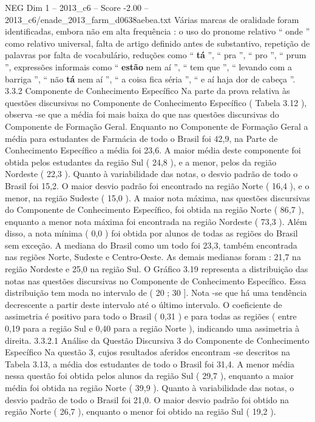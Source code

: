 \begin{textsample}{NEG Dim 1 – 2013\_c6 – Score -2.00 – 2013\_c6/enade\_2013\_farm\_d0638aebea.txt}
Várias marcas de oralidade foram identificadas, embora não em alta frequência : o uso do pronome relativo “ onde ” como relativo universal, falta de artigo definido antes de substantivo, repetição de palavras por falta de vocabulário, reduções como “ \textbf{tá} ”, “ pra ”, “ pro ”, “ prum ”, expressões informais como “ \textbf{estão} nem aí ”, “ tem que ”, “ levando com a barriga ”, “ não \textbf{tá} nem aí ”, “ a coisa fica séria ”, “ e aí haja dor de cabeça ”. 3.3.2 Componente de Conhecimento Específico Na parte da prova relativa às questões discursivas no Componente de Conhecimento Específico ( Tabela 3.12 ), observa -se que a média foi mais baixa do que nas questões discursivas do Componente de Formação Geral.
Enquanto no Componente de Formação Geral a média para estudantes de Farmácia de todo o Brasil foi 42,9, na Parte de Conhecimento Específico a média foi 23,6.
A maior média deste componente foi obtida pelos estudantes da região Sul ( 24,8 ), e a menor, pelos da região Nordeste ( 22,3 ).
Quanto à variabilidade das notas, o desvio padrão de todo o Brasil foi 15,2.
O maior desvio padrão foi encontrado na região Norte ( 16,4 ), e o menor, na região Sudeste ( 15,0 ).
A maior nota máxima, nas questões discursivas do Componente de Conhecimento Específico, foi obtida na região Norte ( 86,7 ), enquanto a menor nota máxima foi encontrada na região Nordeste ( 73,3 ).
Além disso, a nota mínima ( 0,0 ) foi obtida por alunos de todas as regiões do Brasil sem exceção.
A mediana do Brasil como um todo foi 23,3, também encontrada nas regiões Norte, Sudeste e Centro-Oeste.
As demais medianas foram : 21,7 na região Nordeste e 25,0 na região Sul.
O Gráfico 3.19 representa a distribuição das notas nas questões discursivas no Componente de Conhecimento Específico.
Essa distribuição tem moda no intervalo de ( 20 ; 30 ].
Nota -se que há uma tendência decrescente a partir deste intervalo até o último intervalo.
O coeficiente de assimetria é positivo para todo o Brasil ( 0,31 ) e para todas as regiões ( entre 0,19 para a região Sul e 0,40 para a região Norte ), indicando uma assimetria à direita. 3.3.2.1 Análise da Questão Discursiva 3 do Componente de Conhecimento Específico Na questão 3, cujos resultados aferidos encontram -se descritos na Tabela 3.13, a média dos estudantes de todo o Brasil foi 31,4.
A menor média nessa questão foi obtida pelos alunos da região Sul ( 29,7 ), enquanto a maior média foi obtida na região Norte ( 39,9 ).
Quanto à variabilidade das notas, o desvio padrão de todo o Brasil foi 21,0.
O maior desvio padrão foi obtido na região Norte ( 26,7 ), enquanto o menor foi obtido na região Sul ( 19,2 ).

\end{textsample}

